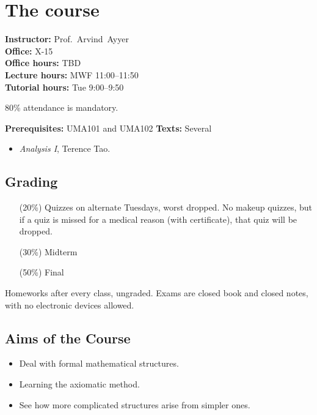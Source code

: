 
\setcounter{section}{-1}
\section{The course} \label{sec:course}
\textbf{Instructor:} Prof.~Arvind~Ayyer\\
\textbf{Office:} X-15\\
\textbf{Office hours:} TBD\\
\textbf{Lecture hours:} MWF 11:00--11:50\\
\textbf{Tutorial hours:} Tue 9:00--9:50

80\% attendance is mandatory.

\textbf{Prerequisites:} UMA101 and UMA102
\textbf{Texts:} Several
\begin{itemize}
    \item \textit{Analysis I}, Terence Tao.
\end{itemize}

\subsection*{Grading} \label{sec:grading}
\begin{itemize}
    \item[(20\%)] Quizzes on alternate Tuesdays, worst dropped.
    No makeup quizzes, but if a quiz is missed for a medical reason
    (with certificate), that quiz will be dropped.
    \item[(30\%)] Midterm
    \item[(50\%)] Final
\end{itemize}
Homeworks after every class, ungraded.
Exams are closed book and closed notes, with no electronic devices allowed.

\subsection*{Aims of the Course} \label{sec:aims}
\begin{itemize}
    \item Deal with formal mathematical structures.
    \item Learning the axiomatic method.
    \item See how more complicated structures arise from simpler ones.
\end{itemize}

